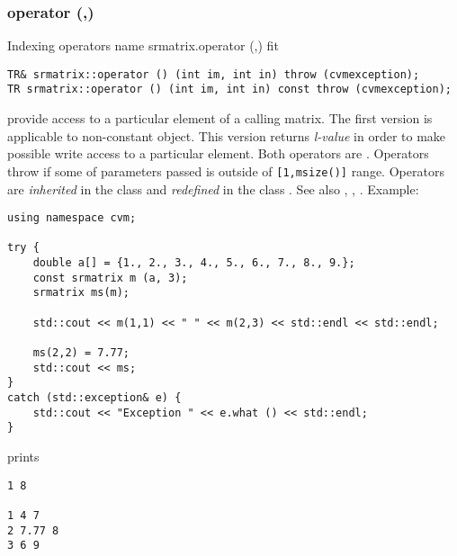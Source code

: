 \subsubsection{operator (,)}
Indexing operators%
\pdfdest name {srmatrix.operator (,)} fit
\begin{verbatim}
TR& srmatrix::operator () (int im, int in) throw (cvmexception);
TR srmatrix::operator () (int im, int in) const throw (cvmexception);
\end{verbatim}
provide access to a particular element of a calling matrix. The first version
is applicable to non-constant object.
This version returns  \emph{l-value}
in order to make possible write access to a particular element.
Both operators are \Based.
Operators throw 
if some of parameters passed
is outside of \verb"[1,msize()]" range.
Operators are \emph{inherited}
in the class
and \emph{redefined}
in the class .
See also ,
,
.
Example:
\begin{Verbatim}
using namespace cvm;

try {
    double a[] = {1., 2., 3., 4., 5., 6., 7., 8., 9.};
    const srmatrix m (a, 3);
    srmatrix ms(m);

    std::cout << m(1,1) << " " << m(2,3) << std::endl << std::endl;

    ms(2,2) = 7.77;
    std::cout << ms;
}
catch (std::exception& e) {
    std::cout << "Exception " << e.what () << std::endl;
}
\end{Verbatim}
prints
\begin{Verbatim}
1 8

1 4 7
2 7.77 8
3 6 9
\end{Verbatim}
\newpage


